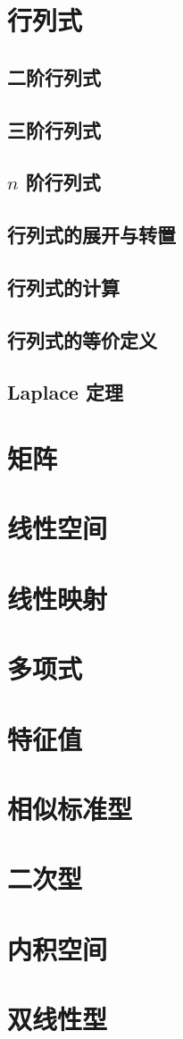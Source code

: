 \documentclass[a4paper, 11pt]{ctexbook}
\begin{document}
    \tableofcontents
    \chapter{行列式}
        \section{二阶行列式}
        \section{三阶行列式}
        \section{\texorpdfstring{$n$}{n} 阶行列式}
        \section{行列式的展开与转置}
        \section{行列式的计算}
        \section{行列式的等价定义}
        \section{Laplace 定理}
    \chapter{矩阵}
    \chapter{线性空间}
    \chapter{线性映射}
    \chapter{多项式}
    \chapter{特征值}
    \chapter{相似标准型}
    \chapter{二次型}
    \chapter{内积空间}
    \chapter{双线性型}
\end{document}
